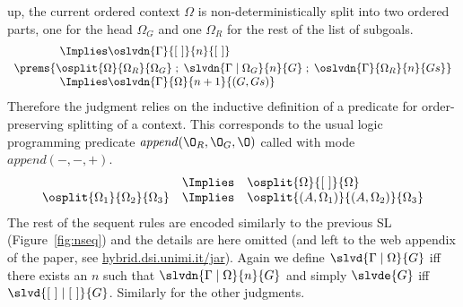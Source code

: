 \documentclass[final]{svjour3}
\begin{document}
up, the current ordered context $\Omega$ is non-deterministically
split into two ordered parts, one for the head $\Omega_G$ and one
$\Omega_R$ for the rest of the list of  subgoals.
\[
\begin{array}{l}
\qquad\qquad   \Implies  \oslvdn{\Gamma}{\elist}{n}{\elist}\\[0.3em]
\prems{ \osplit{\Omega}{\Omega_R}{\Omega_G}\; ;\;
 \slvdn{\Gamma\coln\Omega_G}{n}{G}\; ; \;
  \oslvdn{\Gamma}{\Omega_R}{n}{Gs}}\\
\qquad\qquad  \Implies \oslvdn{\Gamma}{\Omega}{n+1}{(G,  Gs)}
\end{array}
\]
Therefore the judgment relies on the inductive definition of a
predicate for order-preserving splitting of a context. This corresponds to
the usual logic programming predicate $\mathit{append}(\O_R,\O_G,\O)$
called with mode $\mathit{append}(-,-,+)$.
\[
\begin{array}{rcl}
  & \Implies &  \osplit{\Omega}{\elist}{\Omega}\\
  \osplit{\Omega_1}{\Omega_2}{\Omega_3}  & \Implies &
\osplit{(A,  \Omega_1)}{(A,  \Omega_2)}{\Omega_3}
\end{array}
\]
The rest of the sequent rules are encoded similarly to the previous SL
(Figure~\ref{fig:nseq}) and the details are here omitted (and left to
the web appendix of the paper, see \url{hybrid.dsi.unimi.it/jar}).
Again we define $\slvd{\Gamma\coln\Omega}{G}$ iff there exists an $n$
such that $\slvdn{\Gamma\coln\Omega}{n}{G}$ and simply $\slvde{G}$ iff
$\slvd{\elist\coln\elist}{G}$.  Similarly for the other judgments.
\end{document}
